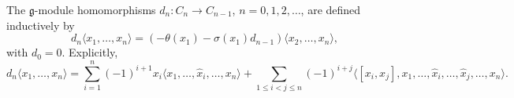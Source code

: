 The $\mathfrak{g}$-module homomorphisms $d_n : C_n \rightarrow C_{n-1}$, $n = 0, 1, 2, \ldots$, are defined inductively by
$$d_n \langle x_1, \ldots, x_n \rangle = (-\theta(x_1) - \sigma(x_1) d_{n-1}) \langle x_2, \ldots, x_n \rangle,$$
with $d_0 = 0$. Explicitly,
$$d_n \langle x_1, \ldots, x_n \rangle = \sum_{i=1}^{n} (-1)^{i+1} x_i \langle x_1, \ldots, \hat{x}_i, \ldots, x_n \rangle + \sum_{1 \leq i < j \leq n} (-1)^{i+j} \langle [x_i, x_j], x_1, \ldots, \hat{x}_i, \ldots, \hat{x}_j, \ldots, x_n \rangle.$$
